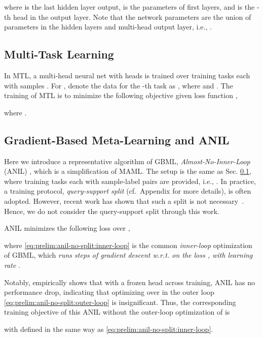 \documentclass{article}
\begin{document}
where  is the last hidden layer output,  is the parameters of first  layers, and  is the -th head in the output layer. Note that the network parameters are the union of parameters in the hidden layers and multi-head output layer, i.e., .

\vspace{-0.5em}
\subsection{Multi-Task Learning}\label{sec:prelim:mtl}
In MTL, a multi-head neural net with  heads is trained over  training tasks each with  samples \cite{ruder2017overview}. For , denote the data for the -th task as , where  and . The training of MTL is to minimize the following objective given loss function ,

where .
\subsection{Gradient-Based Meta-Learning and ANIL}
\label{sec:prelim:gbml}
Here we introduce a representative algorithm of GBML, \textit{Almost-No-Inner-Loop} (ANIL) \cite{raghu2019rapid}, which is a simplification of MAML. The setup is the same as Sec. \ref{sec:prelim:mtl}, where  {training tasks} each with  sample-label pairs are provided, i.e., . In practice, a training protocol, \textit{query-support split} (cf.\ Appendix  for more details), is often adopted. However, recent work has shown that such a split is not necessary~\cite{bai2021how}. Hence, we do not consider the query-support split through this work.

ANIL minimizes the following loss over ,
 
where \eqref{eq:prelim:anil-no-split:inner-loop} is the common \textit{inner-loop} optimization of GBML, which \textit{runs  steps of gradient descent w.r.t.  on the loss , with learning rate }. 

Notably, \citet{lin2021to} empirically shows that with a frozen head  across training, ANIL has no performance drop, indicating that optimizing over  in the outer loop \eqref{eq:prelim:anil-no-split:outer-loop} is insignificant. Thus, the corresponding training objective of this  ANIL without the outer-loop optimization of  is

with  defined in the same way as \eqref{eq:prelim:anil-no-split:inner-loop}.

\vspace{-0.5em}
\end{document}
